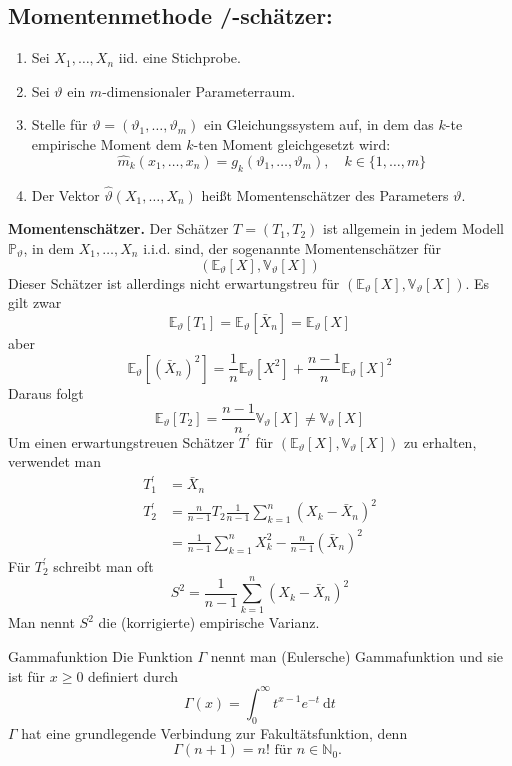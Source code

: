 \subsection{Momentenmethode /-schätzer:} 
\begin{enumerate}
    \item Sei $X_1, \ldots, X_n$ iid. eine Stichprobe. 
    \item Sei $\vartheta$ ein $m$-dimensionaler Parameterraum. 
    \item Stelle für $\vartheta = (\vartheta_1, \ldots, \vartheta_m)$ ein Gleichungssystem auf, in dem das $k$-te empirische Moment dem $k$-ten Moment gleichgesetzt wird: 
    $$
    \hat{m}_k(x_1, \ldots, x_n) = g_k(\vartheta_1, \ldots, \vartheta_m), \quad k \in \{1, \ldots, m\}
    $$
    \item Der Vektor $\hat{\vartheta}(X_1, \ldots, X_n)$ heißt Momentenschätzer des Parameters $\vartheta$.
\end{enumerate}

\textbf{Momentenschätzer.} 
Der Schätzer $T=(T_{1}, T_{2})$ ist allgemein in jedem Modell $\mathbb{P}_{\vartheta}$, in dem $X_{1}, \ldots, X_{n}$ i.i.d. sind, der sogenannte Momentenschätzer für 
$$
(\mathbb{E}_{\vartheta}[X], \mathbb{V}_{\vartheta}[X])
$$
Dieser Schätzer ist allerdings nicht erwartungstreu für $(\mathbb{E}_{\vartheta}[X], \mathbb{V}_{\vartheta}[X])$. Es gilt zwar 
$$
\mathbb{E}_{\vartheta}[T_{1}] = \mathbb{E}_{\vartheta}[\bar{X}_{n}] = \mathbb{E}_{\vartheta}[X]
$$
aber 
$$
\mathbb{E}_{\vartheta}[(\bar{X}_{n})^{2}] = \frac{1}{n} \mathbb{E}_{\vartheta}[X^{2}] + \frac{n-1}{n} \mathbb{E}_{\vartheta}[X]^{2}
$$
Daraus folgt 
$$
\mathbb{E}_{\vartheta}[T_{2}] = \frac{n-1}{n} \mathbb{V}_{\vartheta}[X] \neq \mathbb{V}_{\vartheta}[X]
$$
Um einen erwartungstreuen Schätzer $T^{\prime}$ für $(\mathbb{E}_{\vartheta}[X], \mathbb{V}_{\vartheta}[X])$ zu erhalten, verwendet man
$$
\begin{aligned}
T_{1}^{\prime} &= \bar{X}_{n} \\
T_{2}^{\prime} &= \frac{n}{n-1} T_{2} \frac{1}{n-1} \sum_{k=1}^{n} (X_{k} - \bar{X}_{n})^{2} \\
& = \frac{1}{n-1} \sum_{k=1}^{n} X_{k}^{2} - \frac{n}{n-1} (\bar{X}_{n})^{2}
\end{aligned}
$$
Für $T_{2}^{\prime}$ schreibt man oft
$$
S^{2} = \frac{1}{n-1} \sum_{k=1}^{n} (X_{k} - \bar{X}_{n})^{2}
$$
Man nennt $S^{2}$ die (korrigierte) empirische Varianz.


\begin{subbox}{Gammafunktion}
	Die Funktion $\Gamma$ nennt man (Eulersche) Gammafunktion und sie ist für $x \geq 0$ definiert durch
	$$
	\Gamma(x)=\int_{0}^{\infty} t^{x-1} e^{-t} \mathrm{~d} t
	$$
	$\Gamma$ hat eine grundlegende Verbindung zur Fakultätsfunktion, denn
	$$
	\Gamma(n+1)=n!\text { für } n \in \mathbb{N}_{0} \text {. }
	$$
\end{subbox}

